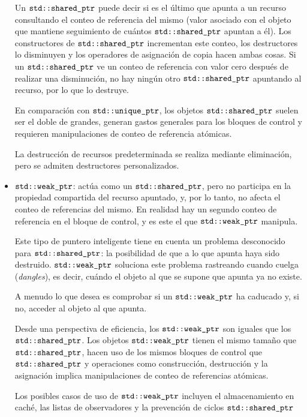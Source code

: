 \documentclass[10pt]{article}
\begin{document}
\begin{itemize}
	Un $ \verb*|std::shared_ptr| $ puede decir si es el último que apunta a un recurso consultando el conteo de referencia del mismo (valor asociado con el objeto que mantiene seguimiento de cuántos $ \verb*|std::shared_ptr| $ apuntan a él). Los constructores de $ \verb*|std::shared_ptr| $ incrementan este conteo, los destructores lo disminuyen y los operadores de asignación de copia hacen ambas cosas. Si un $ \verb*|std::shared_ptr| $ ve un conteo de referencia con valor cero después de realizar una disminución, no hay ning\'un otro $ \verb*|std::shared_ptr| $ apuntando al recurso, por lo que lo destruye.
	
	En comparación con $ \verb*|std::unique_ptr| $, los objetos $ \verb*|std::shared_ptr| $ suelen ser el doble de grandes, generan gastos generales para los bloques de control y requieren manipulaciones de conteo de referencia at\'omicas.
	
	La destrucción de recursos predeterminada se realiza mediante eliminación, pero se admiten destructores personalizados.
	
	\item $ \verb*|std::weak_ptr| $: actúa como un $ \verb*|std::shared_ptr| $, pero no participa en la propiedad compartida del recurso apuntado, y, por lo tanto, no afecta el conteo de referencias del mismo. En realidad hay un segundo conteo de referencia en el bloque de control, y es este el que $ \verb*|std::weak_ptr| $ manipula.
	
	Este tipo de puntero inteligente tiene en cuenta un problema desconocido para $ \verb*|std::shared_ptr| $: la posibilidad de que a lo que apunta haya sido destruido. $ \verb*|std::weak_ptr| $ soluciona este problema rastreando cuando cuelga (\textit{dangles}), es decir, cu\'ando el objeto al que se supone que apunta ya no existe.
	
	A menudo lo que desea es comprobar si un $ \verb*|std::weak_ptr| $ ha caducado y, si no, acceder al objeto al que apunta. 
	
	Desde una perspectiva de eficiencia, los $ \verb*|std::weak_ptr| $ son iguales que los $ \verb*|std::shared_ptr| $. Los objetos $ \verb*|std::weak_ptr| $ tienen el mismo tamaño que $ \verb*|std::shared_ptr| $, hacen uso de los mismos bloques de control que $ \verb*|std::shared_ptr| $ y operaciones como construcción, destrucción y la asignación implica manipulaciones de conteo de referencias atómicas. 
	
	Los posibles casos de uso de $ \verb*|std::weak_ptr| $ incluyen el almacenamiento en caché, las listas de observadores y la prevención de ciclos $ \verb*|std::shared_ptr| $
\end{itemize} 
\end{document}
